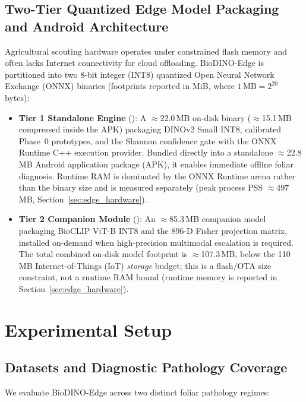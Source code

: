\documentclass[preprint,12pt]{elsarticle}
\begin{document}
\subsection{Two-Tier Quantized Edge Model Packaging and Android Architecture}
\label{sec:packaging}
Agricultural scouting hardware operates under constrained flash memory and often lacks Internet connectivity for cloud offloading. BioDINO-Edge is partitioned into two 8-bit integer (INT8) quantized Open Neural Network Exchange (ONNX) binaries (footprints reported in MiB, where $1\,\text{MB}=2^{20}$ bytes):
\begin{itemize}
    \item \textbf{Tier 1 Standalone Engine} (): A $\approx$22.0\,MB on-disk binary ($\approx$15.1\,MB compressed inside the APK) packaging DINOv2 Small INT8, calibrated Phase~0 prototypes, and the Shannon confidence gate with the ONNX Runtime C++ execution provider. Bundled directly into a standalone $\approx$22.8\,MB Android application package (APK), it enables immediate offline foliar diagnosis. Runtime RAM is dominated by the ONNX Runtime arena rather than the binary size and is measured separately (peak process PSS $\approx$497\,MB, Section~\ref{sec:edge_hardware}).
    \item \textbf{Tier 2 Companion Module} (): An $\approx$85.3\,MB companion model packaging BioCLIP ViT-B INT8 and the 896-D Fisher projection matrix, installed on-demand when high-precision multimodal escalation is required. The total combined on-disk model footprint is $\approx$107.3\,MB, below the 110\,MB Internet-of-Things (IoT) \emph{storage} budget; this is a flash/OTA size constraint, not a runtime RAM bound (runtime memory is reported in Section~\ref{sec:edge_hardware}).
\end{itemize}

\section{Experimental Setup}
\label{sec:experiments_setup}

\subsection{Datasets and Diagnostic Pathology Coverage}
\label{sec:datasets}
We evaluate BioDINO-Edge across two distinct foliar pathology regimes:
\end{document}
